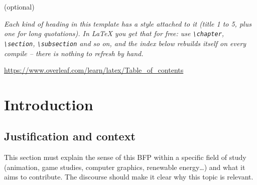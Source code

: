 \documentclass[english]{utad-tfg}
\begin{document}
\tfgcover

\begin{tfgacknowledgements}
(optional)
\end{tfgacknowledgements}

\textit{Each kind of heading in this template has a style attached to it
(title 1 to 5, plus one for long quotations). In LaTeX you get that for
free: use \texttt{\textbackslash chapter}, \texttt{\textbackslash section},
\texttt{\textbackslash subsection} and so on, and the index below rebuilds
itself on every compile -- there is nothing to refresh by hand.}

\url{https://www.overleaf.com/learn/latex/Table_of_contents}

\tfgindex

\begin{tfgabstractpage}

\end{tfgabstractpage}

\chapter{Introduction}

\section{Justification and context}
This section must explain the sense of this BFP within a specific field of
study (animation, game studies, computer graphics, renewable energy\ldots)
and what it aims to contribute. The discourse should make it clear why this
topic is relevant.
\end{document}
